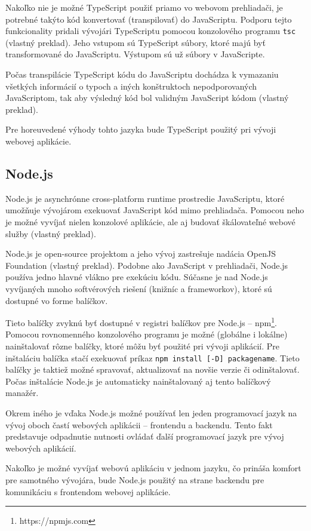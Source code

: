 Nakoľko nie je možné TypeScript použiť priamo vo webovom prehliadači, je potrebné takýto kód konvertovať (transpilovať) do JavaScriptu. Podporu tejto funkcionality pridali vývojári TypeScriptu pomocou konzolového programu \texttt{tsc} \cite{about_typescript} (vlastný preklad). Jeho vstupom sú TypeScript súbory, ktoré majú byť transformované do JavaScriptu. Výstupom sú už súbory v JavaScripte.

Počas transpilácie TypeScript kódu do JavaScriptu dochádza k vymazaniu všetkých informácií o typoch a iných konštruktoch nepodporovaných JavaScriptom, tak aby výsledný kód bol validným JavaScript kódom \cite{about_typescript} (vlastný preklad).

Pre horeuvedené výhody tohto jazyka bude TypeScript použitý pri vývoji webovej aplikácie.

\subsection {Node.js}
Node.js je asynchrónne cross-platform runtime prostredie JavaScriptu, ktoré umožňuje vývojárom exekuovať JavaScript kód mimo prehliadača. Pomocou neho je možné vyvíjať nielen konzolové aplikácie, ale aj budovať škálovateľné webové služby \cite{about_nodejs} (vlastný preklad).

Node.js je open-source projektom a jeho vývoj zastrešuje nadácia OpenJS Foundation \cite{about_nodejs} (vlastný preklad). Podobne ako JavaScript v prehliadači, Node.js používa jedno hlavné vlákno pre exekúciu kódu. Súčasne je nad Node.js vyvíjaných mnoho softvérových riešení (knižníc a frameworkov), ktoré sú dostupné vo forme balíčkov.

Tieto balíčky zvyknú byť dostupné v registri balíčkov pre Node.js -- npm\footnote{https://npmjs.com}. Pomocou rovnomenného konzolového programu je možné (globálne i lokálne) nainštalovať rôzne balíčky, ktoré môžu byť použité pri vývoji aplikácií. Pre inštaláciu balíčka stačí exekuovať príkaz \texttt{npm install [-D] packagename}. Tieto balíčky je taktiež možné spravovať, aktualizovať na novšie verzie či odinštalovať. Počas inštalácie Node.js je automaticky nainštalovaný aj tento balíčkový manažér.

Okrem iného je vďaka Node.js možné používať len jeden programovací jazyk na vývoj oboch častí webových aplikácii -- frontendu a backendu. Tento fakt predstavuje odpadnutie nutnosti ovládať ďalší programovací jazyk pre vývoj webových aplikácií.

Nakoľko je možné vyvíjať webovú aplikáciu v jednom jazyku, čo prináša komfort pre samotného vývojára, bude Node.js použitý na strane backendu pre komunikáciu s frontendom webovej aplikácie.

